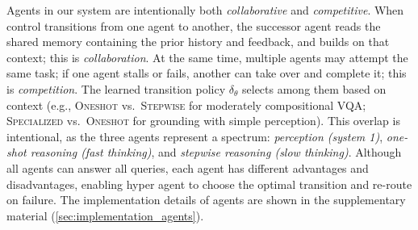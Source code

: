 \documentclass{article} %
\newcommand{\revise}[1]{{#1}}
\begin{document}
\begin{table}[h]
\centering
\caption{\textbf{States of the hyper automaton.} The table specifies the description and the triggering condition for each state. $\delta_\theta$: transition function of hyper automaton.}
\label{tab:states}
\vspace{3mm}
\end{table}

Agents in our system are intentionally both \emph{collaborative} and \emph{competitive}. When control transitions from one agent to another, the successor agent reads the shared memory containing the prior history and feedback, and builds on that context; this is \emph{collaboration}. At the same time, multiple agents may attempt the same task; if one agent stalls or fails, another can take over and complete it; this is \emph{competition}. \revise{The learned transition policy $\delta_\theta$ selects among them based on context (e.g., \textsc{Oneshot} vs.\ \textsc{Stepwise} for moderately compositional VQA; \textsc{Specialized} vs.\ \textsc{Oneshot} for grounding with simple perception). This overlap is intentional, as the three agents represent a spectrum: \emph{perception (system 1)}, \emph{one-shot reasoning (fast thinking)}, and \emph{stepwise reasoning (slow thinking)}. Although all agents can answer all queries, each agent has different advantages and disadvantages, enabling hyper agent to choose the optimal transition and re-route on failure.} The implementation details of agents are shown in the supplementary material (\autoref{sec:implementation_agents}).
\end{document}
